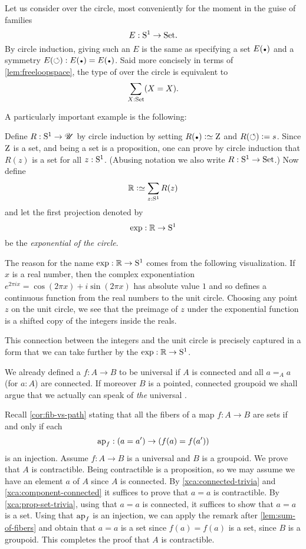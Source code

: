 \begin{example}\label{xca:coveringsofS1}
Let us consider \coverings over the circle, most conveniently 
for the moment in the guise of families 
$$E:{\mathrm{S}^1}\to\mathrm{Set}.$$
By circle induction, giving such an $E$ is the same as 
specifying a set $E(\base)$ and a symmetry $E(\Sloop):E(\base)=E(\base)$.  
Said more concisely in terms of \cref{lem:freeloopspace}, 
the type of \coverings over the circle is equivalent to 
$$\sum_{X:\mathrm{Set}}(X=X).$$
\end{example}
A particularly important example is the following:
\begin{definition}\label{def:RtoS1}
Define $R:{\mathrm{S}^1}\to{\mathscr{U}}$ by circle induction by setting 
$R(\base)\defeq\zet$ and $R(\circlearrowleft)\mathrel{\vcentcolon=} {s}$.
Since $\mathrm{Z}$ is a set, and being a set is a proposition,
one can prove by circle induction that $R(z)$ is a set for all $z:{\mathrm{S}^1}$.
(Abusing notation we also write $R:{\mathrm{S}^1}\to\mathrm{Set}$.) Now define
$$\RR\defeq\sum_{z:\Sc}R(z)$$
and let the first projection denoted by
$$\exp:\mathbb{R}\to {\mathrm{S}^1}$$
be the \emph{exponential \covering of the circle}.
\end{definition}

\begin{remark}
  \label{rem:expforreal}
  The reason for the name $\exp:\mathbb{R}\to {\mathrm{S}^1}$ comes from the following visualization.   
If $x$ is a real number, then the complex exponentiation 
$e^{2\pi i x}=\cos(2\pi x)+i\sin(2\pi x)$ has absolute value $1$ and 
so defines a continuous function from the real numbers to the unit circle.  
Choosing any point $z$ on the unit circle, we see that the preimage of $z$ under 
the exponential function is a shifted copy of the integers inside the reals. 
 
This connection between the integers and the unit circle is precisely captured in 
a form that we can take further by the \covering $\exp:\mathbb{R}\to {\mathrm{S}^1}$.
\end{remark}

We already defined a \covering $f:A\to B$ to be universal if $A$ is connected
and all $a=_A a$ (for $a:A$) are connected. 
If moreover $B$ is a pointed, connected groupoid we shall argue that
we actually can speak of \emph{the} universal \covering.

Recall \cref{cor:fib-vs-path} stating that all the fibers of a map $f:A\to B$ 
are sets if and only if each 
\[
\ap{f}: (a=a')\to (f(a)=f(a'))
\]
is an injection. 
Assume $f:A\to B$ is a universal \covering and $B$ is a groupoid.
We prove that $A$ is contractible. 
Being contractible is a proposition, so we may assume 
we have an element $a$ of $A$ since $A$ is connected. 
By \cref{xca:connected-trivia} and \ref{xca:component-connected} 
it suffices to prove that $a=a$ is contractible.
By \cref{xca:prop-set-trivia}, using that $a=a$ is connected,
it suffices to show that $a=a$ is a set.
Using that $\ap{f}$ is an injection, we can apply the remark after
\cref{lem:sum-of-fibers} and obtain that $a=a$ is a set since
$f(a)=f(a)$ is a set, since $B$ is a groupoid.
This completes the proof that $A$ is contractible.


